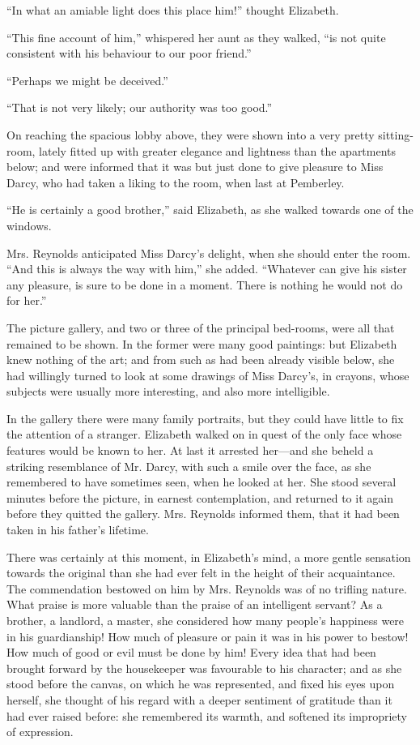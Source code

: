 \documentclass[12pt]{book}
\begin{document}
``In what an amiable light does this place him!'' thought Elizabeth.

``This fine account of him,'' whispered her aunt as they walked, ``is not quite consistent with his behaviour to our poor friend.''

``Perhaps we might be deceived.''

``That is not very likely; our authority was too good.''

On reaching the spacious lobby above, they were shown into a very pretty sitting-room, lately fitted up with greater elegance and lightness than the apartments below; and were informed that it was but just done to give pleasure to Miss Darcy, who had taken a liking to the room, when last at Pemberley.

``He is certainly a good brother,'' said Elizabeth, as she walked towards one of the windows.

Mrs. Reynolds anticipated Miss Darcy's delight, when she should enter the room. ``And this is always the way with him,'' she added. ``Whatever can give his sister any pleasure, is sure to be done in a moment. There is nothing he would not do for her.''

The picture gallery, and two or three of the principal bed-rooms, were all that remained to be shown. In the former were many good paintings: but Elizabeth knew nothing of the art; and from such as had been already visible below, she had willingly turned to look at some drawings of Miss Darcy's, in crayons, whose subjects were usually more interesting, and also more intelligible.

In the gallery there were many family portraits, but they could have little to fix the attention of a stranger. Elizabeth walked on in quest of the only face whose features would be known to her. At last it arrested her---and she beheld a striking resemblance of Mr. Darcy, with such a smile over the face, as she remembered to have sometimes seen, when he looked at her. She stood several minutes before the picture, in earnest contemplation, and returned to it again before they quitted the gallery. Mrs. Reynolds informed them, that it had been taken in his father's lifetime.

There was certainly at this moment, in Elizabeth's mind, a more gentle sensation towards the original than she had ever felt in the height of their acquaintance. The commendation bestowed on him by Mrs. Reynolds was of no trifling nature. What praise is more valuable than the praise of an intelligent servant? As a brother, a landlord, a master, she considered how many people's happiness were in his guardianship! How much of pleasure or pain it was in his power to bestow! How much of good or evil must be done by him! Every idea that had been brought forward by the housekeeper was favourable to his character; and as she stood before the canvas, on which he was represented, and fixed his eyes upon herself, she thought of his regard with a deeper sentiment of gratitude than it had ever raised before: she remembered its warmth, and softened its impropriety of expression.
\end{document}

